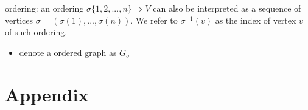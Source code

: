 ordering: an ordering \(\sigma \{1, 2, ... , n\} \Rightarrow V\) can
also be interpreted as a sequence of vertices
\(\sigma = (\sigma(1), ... , \sigma(n))\). We refer to
\(\sigma^{−1} (v)\) as the index of vertex \(v\) of such ordering.

\begin{itemize}
      \tightlist
      \item
            denote a ordered graph as \(G_\sigma\)
\end{itemize}





\section*{Appendix}\label{sec:appendix}


